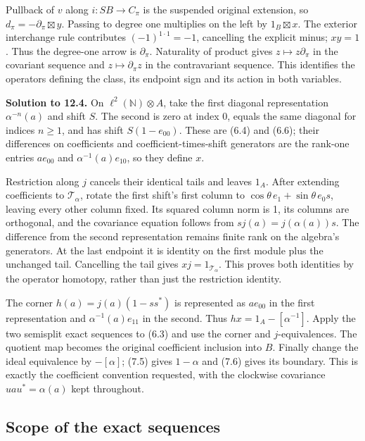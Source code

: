 \documentclass[
  11pt,
]{article}
\begin{document}
Pullback of \(v\) along \(i:SB\to C_\pi\) is the suspended original
extension, so \(d_\pi=-\partial_\pi\boxtimes y\). Passing to degree one
multiplies on the left by \(1_B\boxtimes x\). The exterior interchange
rule contributes \((-1)^{1\cdot1}=-1\), cancelling the explicit minus;
\(xy=1\). Thus the degree-one arrow is \(\partial_\pi\). Naturality of
product gives \(z\mapsto z\partial_\pi\) in the covariant sequence and
\(z\mapsto\partial_\pi z\) in the contravariant sequence. This
identifies the operators defining the class, its endpoint sign and its
action in both variables.

\textbf{Solution to 12.4.} On \(\ell^2(\mathbb N)\otimes A\), take the
first diagonal representation \(\alpha^{-n}(a)\) and shift \(S\). The
second is zero at index 0, equals the same diagonal for indices
\(n\ge1\), and has shift \(S(1-e_{00})\). These are (6.4) and (6.6);
their differences on coefficients and coefficient-times-shift generators
are the rank-one entries \(a e_{00}\) and \(\alpha^{-1}(a)e_{10}\), so
they define \(x\).

Restriction along \(j\) cancels their identical tails and leaves
\(1_A\). After extending coefficients to \(\mathcal T_\alpha\), rotate
the first shift's first column to \(\cos\theta\,e_1+\sin\theta\,e_0s\),
leaving every other column fixed. Its squared column norm is 1, its
columns are orthogonal, and the covariance equation follows from
\(sj(a)=j(\alpha(a))s\). The difference from the second representation
remains finite rank on the algebra's generators. At the last endpoint it
is identity on the first module plus the unchanged tail. Cancelling the
tail gives \(xj=1_{\mathcal T_\alpha}\). This proves both identities by
the operator homotopy, rather than just the restriction identity.

The corner \(h(a)=j(a)(1-ss^*)\) is represented as \(a e_{00}\) in the
first representation and \(\alpha^{-1}(a)e_{11}\) in the second. Thus
\(hx=1_A-[\alpha^{-1}]\). Apply the two semisplit exact sequences to
(6.3) and use the corner and \(j\)-equivalences. The quotient map
becomes the original coefficient inclusion into \(B\). Finally change
the ideal equivalence by \(-[\alpha]\); (7.5) gives \(1-\alpha\) and
(7.6) gives its boundary. This is exactly the coefficient convention
requested, with the clockwise covariance \(uau^*=\alpha(a)\) kept
throughout.

\subsection{Scope of the exact
sequences}\label{scope-of-the-exact-sequences}
\end{document}
